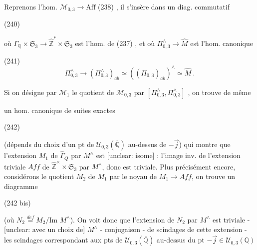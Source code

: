 Reprenons l'hom. $\mathcal{M}_{0,3} \to \text{Aff}$ (238) , il s'insère dans un diag. commutatif

(240)

où $\Gamma_{\mathbb{Q}} \times \mathfrak{S}_3 \to \hat{\mathbb{Z}}^* \times \mathfrak{S}_3$ est l'hom. de (237) , et
où $\Pi_{0,3}^\wedge \to \hat{M}$ est l'hom. canonique

(241) $$ \Pi_{0,3}^\wedge \to (\Pi_{0,3}^\wedge)_{ab} \simeq ((\Pi_{0,3})_{ab})^\wedge \simeq \hat{M} \ . $$

Si on désigne par $\mathcal{M}_1$ le quotient de $\mathcal{M}_{0,3}$ par $[\Pi_{0,3}^\wedge, \Pi_{0,3}^\wedge]$ , on trouve de même

\newpage


un hom. canonique de suites exactes

(242)

(dépends du choix d'un pt de $\mathcal{U}_{0,3}(\overline{\mathbb{Q}})$ au-dessus de $-\vec{j}$)
qui montre que l'extension $M_1$ de $\hat{\Gamma}_Q$ par $M^\wedge$
est [unclear: isome] : l'image inv. de l'extension
triviale $Aff$ de $\hat{\mathbb{Z}}^\times \times \mathfrak{S}_3$ par $M^\wedge$, donc est
triviale. Plus précisément encore, considérons
le quotient $M_2$ de $M_1$ par le noyau de $M_1 \to Aff$,
on trouve un diagramme

(242 bis)

(où $N_2 \overset{def}{=} M_2 / \text{Im } M^\wedge$). On voit donc
que l'extension de $N_2$ par $M^\wedge$ est triviale
- [unclear: avec un choix de] $M^\wedge$ - conjugaison -
de scindages de cette extension - les
scindages correspondant aux pts de
$\mathcal{U}_{0,3}(\overline{\mathbb{Q}})$ au-dessus du pt $-\vec{j} \in \mathcal{U}_{0,3}(\mathbb{Q})$

